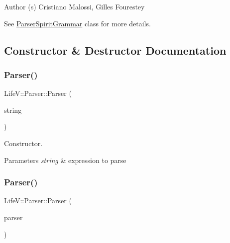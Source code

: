 \begin{DoxyAuthor}{Author}
(s) Cristiano Malossi, Gilles Fourestey
\end{DoxyAuthor}
See {\ttfamily \hyperlink{classLifeV_1_1ParserSpiritGrammar}{Parser\+Spirit\+Grammar}} class for more details. 

\subsection{Constructor \& Destructor Documentation}
\mbox{\label{classLifeV_1_1Parser_a6acf25b7222f0c65d1414611236d1820}} 
\subsubsection{\texorpdfstring{Parser()}{Parser()}\hspace{0.1cm}{\footnotesize\ttfamily [1/2]}}
{\footnotesize\ttfamily Life\+V\+::\+Parser\+::\+Parser (\begin{DoxyParamCaption}\item[{const std\+::string \&}]{string }\end{DoxyParamCaption})\hspace{0.3cm}{\ttfamily [explicit]}}



Constructor. 


\begin{DoxyParams}{Parameters}
{\em string} & expression to parse \\
\hline
\end{DoxyParams}
\mbox{\label{classLifeV_1_1Parser_a0f7c4d10928fd2139e76baf44996b610}} 
\subsubsection{\texorpdfstring{Parser()}{Parser()}\hspace{0.1cm}{\footnotesize\ttfamily [2/2]}}
{\footnotesize\ttfamily Life\+V\+::\+Parser\+::\+Parser (\begin{DoxyParamCaption}\item[{const \hyperlink{classLifeV_1_1Parser}{Parser} \&}]{parser }\end{DoxyParamCaption})\hspace{0.3cm}{\ttfamily [explicit]}}



